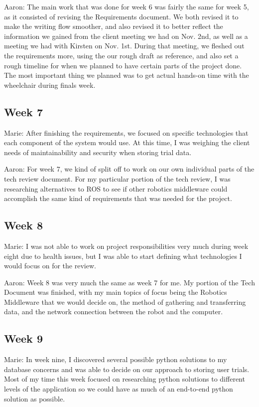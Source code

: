 \documentclass[onecolumn, draftclsnofoot,10pt, compsoc]{IEEEtran}
\begin{document}
Aaron: The main work that was done for week 6 was fairly the same for week 5, as it consisted of revising the Requirements document. We both revised it to make the writing flow smoother, and also revised it to better reflect the information we gained from the client meeting we had on Nov. 2nd, as well as a meeting we had with Kirsten on Nov. 1st. During that meeting, we fleshed out the requirements more, using the our rough draft as reference, and also set a rough timeline for when we planned to have certain parts of the project done. The most important thing we planned was to get actual hands-on time with the wheelchair during finals week.\par

\subsection{Week 7}
Marie: After finishing the requirements, we focused on specific technologies that each component of the system would use. At this time, I was weighing the client needs of maintainability and security when storing trial data.\par

Aaron: For week 7, we kind of split off to work on our own individual parts of the tech review document. For my particular portion of the tech review, I was researching alternatives to ROS to see if other robotics middleware could accomplish the same kind of requirements that was needed for the project.\par

\subsection{Week 8}
Marie: I was not able to work on project responsibilities very much during week eight due to health issues, but I was able to start defining what technologies I would focus on for the review.\par

Aaron: Week 8 was very much the same as week 7 for me. My portion of the Tech Document was finished, with my main topics of focus being the Robotics Middleware that we would decide on, the method of gathering and transferring data, and the network connection between the robot and the computer.\par

\subsection{Week 9}
Marie: In week nine, I discovered several possible python solutions to my database concerns and was able to decide on our approach to storing user trials. Most of my time this week focused on researching python solutions to different levels of the application so we could have as much of an end-to-end python solution as possible.\par
\end{document}
